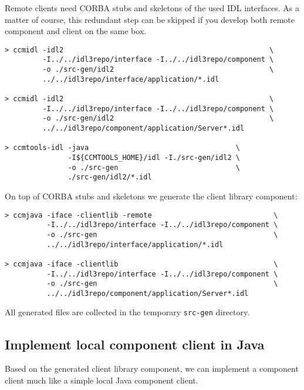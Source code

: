 \vspace{3mm}
Remote clients need CORBA stubs and skeletons of the used IDL interfaces.
As a matter of course, this redundant step can be skipped if you develop both
remote component and client on the same box.
\begin{footnotesize}
\begin{verbatim}
> ccmidl -idl2                                                 \
         -I../../idl3repo/interface -I../../idl3repo/component \ 
         -o ./src-gen/idl2                                     \
         ../../idl3repo/interface/application/*.idl

> ccmidl -idl2                                                 \ 
         -I../../idl3repo/interface -I../../idl3repo/component \
         -o ./src-gen/idl2                                     \
         ../../idl3repo/component/application/Server*.idl

> ccmtools-idl -java                                   \
               -I${CCMTOOLS_HOME}/idl -I./src-gen/idl2 \ 
               -o ./src-gen                            \
               ./src-gen/idl2/*.idl
\end{verbatim}
\end{footnotesize}

On top of CORBA stubs and skeletons we generate the client library component:
\begin{footnotesize}
\begin{verbatim}
> ccmjava -iface -clientlib -remote                             \
          -I../../idl3repo/interface -I../../idl3repo/component \
          -o ./src-gen                                          \
          ../../idl3repo/interface/application/*.idl

> ccmjava -iface -clientlib                                     \
          -I../../idl3repo/interface -I../../idl3repo/component \
          -o ./src-gen                                          \
          ../../idl3repo/component/application/Server*.idl
\end{verbatim}
\end{footnotesize}

All generated files are collected in the temporary {\tt src-gen} directory.



\subsection{Implement local component client in Java}
\label{subsection:ImplementRemoteComponentClientInJava}
Based on the generated client library component, we can implement a
component client much like a simple local Java component client.

